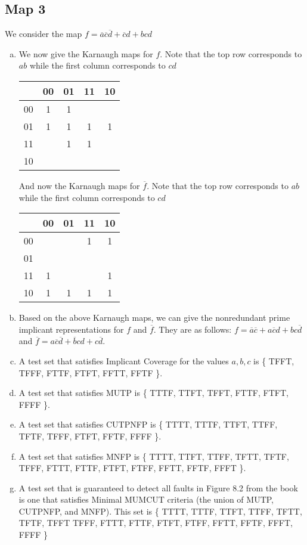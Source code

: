 \documentclass{article}
\newcommand{\nota}{\overline{a}}
\newcommand{\notb}{\overline{b}}
\newcommand{\notc}{\overline{c}}
\newcommand{\notd}{\overline{d}}
\newcommand{\fbar}{\overline{f}}
\begin{document}
\subsection*{Map 3}
We consider the map $ f = \nota \notc \notd + \notc d + bcd $
\begin{enumerate}[(a)]
	\item We now give the Karnaugh maps for $f$. Note that the top row corresponds to $ab$ while the first column corresponds to $cd$
	\begin{center}
		\begin{tabular}{c||c|c|c|c|}
			& 00 & 01 & 11 & 10 \\
			\hline
			00 & 1 & 1 & & \\
			\hline
			01 & 1 & 1 & 1 & 1 \\
			\hline
			11 & & 1 & 1 & \\
			\hline
			10 & & & & \\
			\hline
		\end{tabular}
	\end{center}
	And now the Karnaugh maps for $\fbar$. Note that the top row corresponds to $ab$ while the first column corresponds to $cd$
	\begin{center}
		\begin{tabular}{c||c|c|c|c|}
			& 00 & 01 & 11 & 10 \\
			\hline
			00 & & & 1 & 1 \\
			\hline
			01 & & & & \\
			\hline
			11 & 1 & & & 1 \\
			\hline
			10 & 1 & 1 & 1 & 1 \\
			\hline
		\end{tabular}
	\end{center}
	\item Based on the above Karnaugh maps, we can give the nonredundant prime implicant representations for $f$ and $\fbar$. They are as follows: $ f = \nota \notc + a \notc d + bc\notd $ and $ \fbar = a \notc \notd + \notb cd + c \notd $.
	\item A test set that satisfies Implicant Coverage for the values $a,b,c$ is \{ TFFT, TFFF, FTTF, FTFT, FFTT, FFTF \}.
	\item A test set that satisfies MUTP is \{ TTTF, TTFT, TFFT, FTTF, FTFT, FFFF \}.
	\item A test set that satisfies CUTPNFP is \{ TTTT, TTTF, TTFT, TTFF, TFTF, TFFF, FTFT, FFTF, FFFF \}.
	\item A test set that satisfies MNFP is \{ TTTT, TTFT, TTFF, TFTT, TFTF, TFFF, FTTT, FTTF, FTFT, FTFF, FFTT, FFTF, FFFT \}.
	\item A test set that is guaranteed to detect all faults in Figure 8.2 from the book is one that satisfies Minimal MUMCUT criteria (the union of MUTP, CUTPNFP, and MNFP). This set is \{ TTTT, TTTF, TTFT, TTFF, TFTT, TFTF, TFFT TFFF, FTTT, FTTF, FTFT, FTFF, FFTT, FFTF, FFFT, FFFF \}
\end{enumerate}
\end{document}
